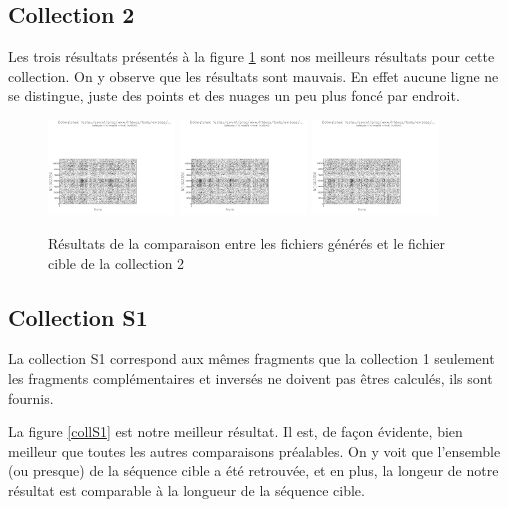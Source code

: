 \documentclass[12pt,a4paper,final]{article}
\begin{document}
\subsection{Collection 2}
Les trois résultats présentés à la figure \ref{coll2} sont nos meilleurs résultats pour cette collection. On y observe que les résultats sont mauvais. En effet aucune ligne ne se distingue, juste des points et des nuages un peu plus foncé par endroit.

\begin{figure}[!ht]
	\centering
	\includegraphics[width=0.3\textwidth]{images/collection2/collection2_1.png}
	\includegraphics[width=0.3\textwidth]{images/collection2/collection2_2.png}
	\includegraphics[width=0.3\textwidth]{images/collection2/collection2_3.png}
	\caption{\label{coll2}Résultats de la comparaison entre les fichiers générés et le fichier cible de la collection 2}
\end{figure}

\subsection{Collection S1}
La collection S1 correspond aux mêmes fragments que la collection 1 seulement les fragments complémentaires et inversés ne doivent pas êtres calculés, ils sont fournis.

La figure \ref{collS1} est notre meilleur résultat. Il est, de façon évidente, bien meilleur que toutes les autres comparaisons préalables. On y voit que l'ensemble (ou presque) de la séquence cible a été retrouvée, et en plus, la longeur de notre résultat est comparable à la longueur de la séquence cible.
\end{document}
